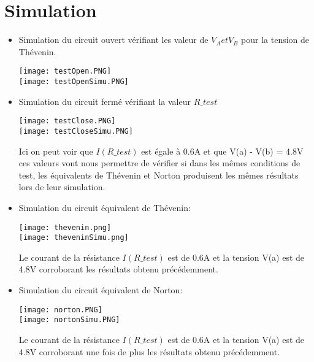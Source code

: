 \documentclass{homeworg}
\begin{document}
\section{Simulation}
\begin{itemize}
    \item Simulation du circuit ouvert vérifiant les valeur de $V_A et V_B$ pour la tension de Thévenin.
        \begin{center}
            \texttt{[image: testOpen.PNG]}\\
            \texttt{[image: testOpenSimu.PNG]}\\
        \end{center}
    \newpage
    \item Simulation du circuit fermé vérifiant la valeur $R\_test$
        \begin{center}
            \texttt{[image: testClose.PNG]}\\
            \texttt{[image: testCloseSimu.PNG]}
        \end{center}
        Ici on peut voir que $I(R\_test)$ est égale à 0.6A et que V(a) - V(b) = 4.8V
        ces valeurs vont nous permettre de vérifier si dans les mêmes conditions de test, les équivalents de Thévenin et Norton produisent les mêmes résultats lors de leur simulation.
    \newpage
    \item Simulation du circuit équivalent de Thévenin:
        \begin{center}
            \texttt{[image: thevenin.png]}\\
            \texttt{[image: theveninSimu.png]}
        \end{center}
        Le courant de la résistance $I(R\_test)$ est de 0.6A et la tension V(a) est de 4.8V corroborant les résultats obtenu précédemment.
    \newpage
    \item Simulation du circuit équivalent de Norton:
        \begin{center}
            \texttt{[image: norton.PNG]}\\
            \texttt{[image: nortonSimu.PNG]}
        \end{center}
        Le courant de la résistance $I(R\_test)$ est de 0.6A et la tension V(a) est de 4.8V corroborant une fois de plus les résultats obtenu précédemment.
\end{itemize}
\end{document}
